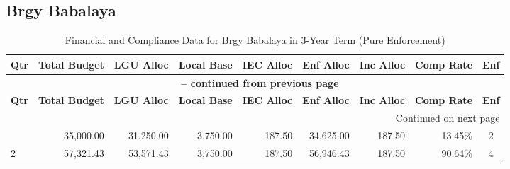 \subsection{Brgy Babalaya}
\begin{longtable}{lrrrrrrrc}
\caption{Financial and Compliance Data for Brgy Babalaya in 3-Year Term (Pure Enforcement)} \\
\toprule
\textbf{Qtr} & \textbf{Total Budget} & \textbf{LGU Alloc} & \textbf{Local Base} & \textbf{IEC Alloc} & \textbf{Enf Alloc} & \textbf{Inc Alloc} & \textbf{Comp Rate} & \textbf{Enf} \\
\midrule
\endfirsthead
\multicolumn{9}{c}{{\bfseries \tablename\ \thetable{} -- continued from previous page}} \\
\toprule
\textbf{Qtr} & \textbf{Total Budget} & \textbf{LGU Alloc} & \textbf{Local Base} & \textbf{IEC Alloc} & \textbf{Enf Alloc} & \textbf{Inc Alloc} & \textbf{Comp Rate} & \textbf{Enf} \\
\midrule
\endhead
\hline \multicolumn{9}{r}{{Continued on next page}} \\ \hline
\endfoot
\bottomrule
\endlastfoot
1 & 35,000.00 & 31,250.00 & 3,750.00 & 187.50 & 34,625.00 & 187.50 & 13.45\% & 2 \\
2 & 57,321.43 & 53,571.43 & 3,750.00 & 187.50 & 56,946.43 & 187.50 & 90.64\% & 4 \\
\end{longtable}